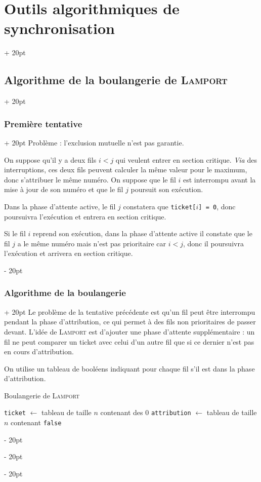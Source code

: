 \documentclass[a4paper, 12pt, twoside]{article}
\newenvironment{indalgo}[2][H]{
    \begin{minipage}{\linewidth-\leftskip-5pt}
        \begin{algorithm}[#1]
            \caption{#2}
}
{
        \end{algorithm}
    \end{minipage}
}
\newcommand{\ind}[1][20pt]{\advance\leftskip + #1}
\newcommand{\deind}[1][20pt]{\advance\leftskip - #1}
\newenvironment{indt}[2][20pt]{#2 \par \ind[#1]}{\par \deind} %
\begin{document}
\begin{indt}{\section{Outils algorithmiques de synchronisation}}
\begin{indt}{\subsection{Algorithme de la boulangerie de \textsc{Lamport}}}
\begin{indt}{\subsubsection{Première tentative}}
                Problème : l'exclusion mutuelle n'est pas garantie.

                On suppose qu'il y a deux fils $i < j$ qui veulent entrer en section critique.
                \textit{Via} des interruptions, ces deux fils peuvent calculer la même valeur pour le maximum, donc s'attribuer le même numéro.
                On suppose que le fil $i$ est interrompu avant la mise à jour de son numéro et que le fil $j$ poursuit son exécution.

                Dans la phase d'attente active, le fil $j$ constatera que \texttt{ticket[$i$] = 0}, donc poursuivra l'exécution et entrera en section critique.

                Si le fil $i$ reprend son exécution, dans la phase d'attente active il constate que le fil $j$ a le même numéro mais n'est pas prioritaire car $i < j$, donc il poursuivra l'exécution et arrivera en section critique.
            \end{indt}

            \vspace{12pt}
            
            \begin{indt}{\subsubsection{Algorithme de la boulangerie}}
                Le problème de la tentative précédente est qu'un fil peut être interrompu pendant la phase d'attribution, ce qui permet à des fils non prioritaires de passer devant.
                L'idée de \textsc{Lamport} est d'ajouter une phase d'attente supplémentaire : un fil ne peut comparer un ticket avec celui d'un autre fil que si ce dernier n'est pas en cours d'attribution.

                \vspace{6pt}
                
                On utilise un tableau de booléens indiquant pour chaque fil s'il est dans la phase d'attribution.

                \vspace{6pt}
                
                \begin{indalgo}{Boulangerie de \textsc{Lamport}}

                    \texttt{ticket} $\gets$ tableau de taille $n$ contenant des 0\;
                    \texttt{attribution} $\gets$ tableau de taille $n$ contenant \texttt{false}\;


\end{indalgo}
\end{indt}
\end{indt}
\end{indt}
\end{document}
